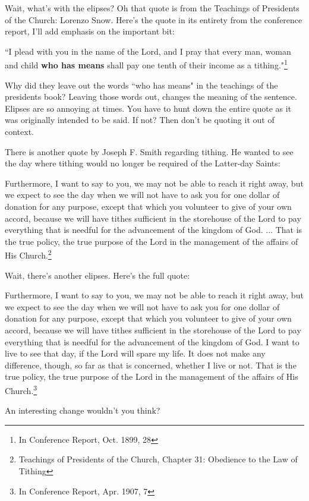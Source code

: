 Wait, what's with the elipses? Oh that quote is from the Teachings of Presidents of
the Church: Lorenzo Snow. Here's the quote in its entirety from the conference
report, I'll add emphasis on the important bit:

\begin{displayquote}
``I plead with you in the name of the Lord, and I pray that every man, woman and child 
\textbf{who has means} shall pay one tenth of their income as a tithing."\footnote{
In Conference Report, Oct. 1899, 28
}
\end{displayquote}

Why did they leave out the words ``who has means" in the teachings of the presidents
book? Leaving those words out, changes the meaning of the sentence. Elipses are so
annoying at times. You have to hunt down the entire quote as it was originally
intended to be said. If not? Then don't be quoting it out of context.

There is another quote by Joseph F. Smith regarding tithing. He wanted to see the day
where tithing would no longer be required of the Latter-day Saints:

\begin{displayquote}
Furthermore, I want to say to you, we may not be able to reach it right away, but we 
expect to see the day when we will not have to ask you for one dollar of donation for 
any purpose, except that which you volunteer to give of your own accord, because we 
will have tithes sufficient in the storehouse of the Lord to pay everything that is 
needful for the advancement of the kingdom of God. ... That is the true policy, the 
true purpose of the Lord in the management of the affairs of His 
Church.\footnote{Teachings of Presidents of the Church, Chapter 31: Obedience to the
Law of Tithing}
\end{displayquote}

Wait, there's another elipses. Here's the full quote:

\begin{displayquote}
Furthermore, I want to say to you, we may not be able to reach it right away, but we 
expect to see the day when we will not have to ask you for one dollar of donation for 
any purpose, except that which you volunteer to give of your own accord, because we 
will have tithes sufficient in the storehouse of the Lord to pay everything that is 
needful for the advancement of the kingdom of God. I want to live to see that day, if 
the Lord will spare my life. It does not make any difference, though, so far as that 
is concerned, whether I live or not. That is the true policy, the true purpose of the 
Lord in the management of the affairs of His 
Church.\footnote{In Conference Report, Apr. 1907, 7 }
\end{displayquote}

An interesting change wouldn't you think?